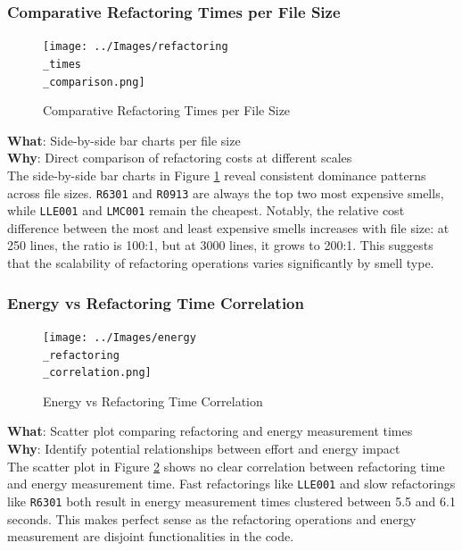 \documentclass[12pt, titlepage]{article}
\begin{document}
\subsubsection{Comparative Refactoring Times per File Size}
\begin{figure}[H]
  \centering
  \texttt{[image: ../Images/refactoring\\\_times\\\_comparison.png]}
  \caption{Comparative Refactoring Times per File Size}
  \label{fig:refactoring_comparison}
\end{figure}

\noindent \textbf{What}: Side-by-side bar charts per file size\\

\noindent \textbf{Why}: Direct comparison of refactoring costs at
different scales\\

The side-by-side bar charts in Figure \ref{fig:refactoring_comparison} reveal consistent dominance patterns
across file sizes. \texttt{R6301} and \texttt{R0913} are always the
top two most expensive smells, while \texttt{LLE001} and
\texttt{LMC001} remain the cheapest. Notably, the relative cost
difference between the most and least expensive smells increases with
file size: at 250 lines, the ratio is 100:1, but at 3000 lines, it
grows to 200:1. This suggests that the scalability of refactoring
operations varies significantly by smell type.

\subsubsection{Energy vs Refactoring Time Correlation}

\begin{figure}[H]
  \centering
  \texttt{[image: ../Images/energy\\\_refactoring\\\_correlation.png]}
  \caption{Energy vs Refactoring Time Correlation}
  \label{fig:energy_correlation}
\end{figure}

\noindent \textbf{What}: Scatter plot comparing refactoring and
energy measurement times\\

\noindent \textbf{Why}: Identify potential relationships between
effort and energy impact\\

The scatter plot in Figure \ref{fig:energy_correlation} shows no clear correlation between refactoring time
and energy measurement time. Fast refactorings like \texttt{LLE001}
and slow refactorings like \texttt{R6301} both result in energy
measurement times clustered between 5.5 and 6.1 seconds. This makes
perfect sense as the refactoring operations and energy measurement
are disjoint functionalities in the code.
\end{document}
